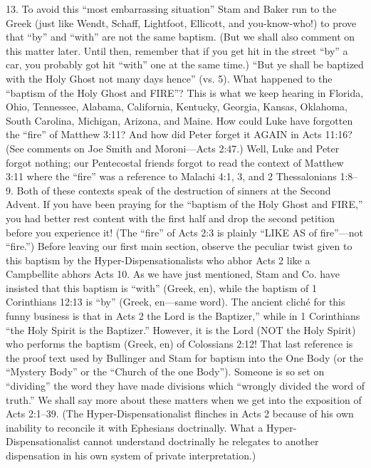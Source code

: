13. To avoid this “most embarrassing situation” Stam and Baker run to the Greek (just like Wendt,
Schaff, Lightfoot, Ellicott, and you-know-who!) to prove that “by” and “with” are not the same
baptism. (But we shall also comment on this matter later. Until then, remember that if you get hit in the
street “by” a car, you probably got hit “with” one at the same time.)
“But ye shall be baptized with the Holy Ghost not many days hence” (vs. 5). What happened
to the “baptism of the Holy Ghost and FIRE”? This is what we keep hearing in Florida, Ohio,
Tennessee, Alabama, California, Kentucky, Georgia, Kansas, Oklahoma, South Carolina, Michigan,
Arizona, and Maine. How could Luke have forgotten the “fire” of Matthew 3:11? And how did Peter
forget it AGAIN in Acts 11:16? (See comments on Joe Smith and Moroni—Acts 2:47.)
Well, Luke and Peter forgot nothing; our Pentecostal friends forgot to read the context of Matthew
3:11 where the “fire” was a reference to Malachi 4:1, 3, and 2 Thessalonians 1:8–9. Both of these
contexts speak of the destruction of sinners at the Second Advent. If you have been praying for the
“baptism of the Holy Ghost and FIRE,” you had better rest content with the first half and drop the
second petition before you experience it! (The “fire” of Acts 2:3 is plainly “LIKE AS of fire”—not
“fire.”)
Before leaving our first main section, observe the peculiar twist given to this baptism by the Hyper-Dispensationalists who abhor Acts 2 like a Campbellite abhors Acts 10. As we have just mentioned, Stam and Co. have insisted that this baptism is “with” (Greek, en), while the baptism of 1
Corinthians 12:13 is “by” (Greek, en—same word). The ancient cliché for this funny business is that in Acts 2 the Lord is the Baptizer,” while in 1 Corinthians “the Holy Spirit is the Baptizer.” However, it is the Lord (NOT the Holy Spirit) who performs the baptism (Greek, en) of Colossians 2:12! That last reference is the proof text used by Bullinger and Stam for baptism into the One Body (or the “Mystery Body” or the “Church of the one Body”). Someone is so set on “dividing” the word they have made divisions which “wrongly divided the word of truth.” We shall say more about these matters when we get into the exposition of Acts 2:1–39.
(The Hyper-Dispensationalist flinches in Acts 2 because of his own inability to reconcile it with Ephesians doctrinally. What a Hyper-Dispensationalist cannot understand doctrinally he relegates to another dispensation in his own system of private interpretation.)